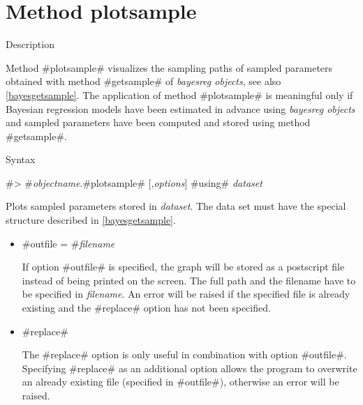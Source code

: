 \clearpage



\section{Method plotsample}
\label{graphplotsample} 
 

\begin{stanza}{Description}

{Method #plotsample# visualizes the sampling paths of sampled
parameters obtained with method #getsample# of {\em bayesreg
objects}, see also \autoref{bayesgetsample}. The application of
method #plotsample# is meaningful only if Bayesian regression
models have been estimated in advance using {\em bayesreg objects}
and sampled parameters have been computed and stored using method
#getsample#.}
\end{stanza}

\begin{stanza}{Syntax}

{#> #{\em objectname}.#plotsample# [,{\em options}] #using# {\em dataset}

Plots sampled parameters stored in {\em dataset}. The data set
must have the special structure described in
\autoref{bayesgetsample}.}
\end{stanza}


\begin{itemize}
\item #outfile = #{\em filename}

If option #outfile# is specified, the graph will be stored as a
postscript file instead of being printed on the screen. The full
path and the filename have to be specified in {\em filename}. An
error will be raised if the specified file is already existing and
the #replace# option has not been specified.

\item #replace#

The #replace# option is only useful in combination with option
#outfile#. Specifying #replace# as an additional option allows the
program to overwrite an already existing file (specified in
#outfile#), otherwise an error will be raised.
\end{itemize}
